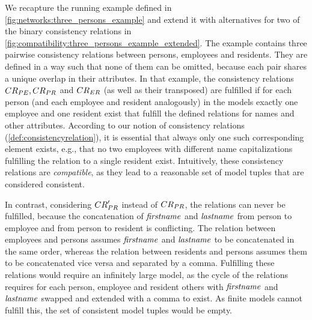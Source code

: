 We recapture the running example defined in \autoref{fig:networks:three_persons_example} and extend it with alternatives for two of the binary consistency relations in \autoref{fig:compatibility:three_persons_example_extended}.
The example contains three pairwise consistency relations between persons, employees and residents.
They are defined in a way such that none of them can be omitted, because each pair shares a unique overlap in their attributes.
In that example, the consistency relations $\consistencyrelation{CR}{PE}, \consistencyrelation{CR}{PR}$ and $\consistencyrelation{CR}{ER}$ (as well as their transposed) are fulfilled if for each person (and each employee and resident analogously) in the models exactly one employee and one resident exist that fulfill the defined relations for names and other attributes.
According to our notion of consistency relations (\autoref{def:consistencyrelation}), it is essential that always only one such corresponding element exists, e.g., that no two employees with different name capitalizations fulfilling the relation to a single resident exist.
Intuitively, these consistency relations are \emph{compatible}, as they lead to a reasonable set of model tuples that are considered consistent.

In contrast, considering $\consistencyrelation{CR}{PR}'$ instead of $\consistencyrelation{CR}{PR}$, the relations can never be fulfilled, because the concatenation of $\mathit{firstname}$ and $\mathit{lastname}$ from person to employee and from person to resident is conflicting.
The relation between employees and persons assumes $\mathit{firstname}$ and $\mathit{lastname}$ to be concatenated in the same order, whereas the relation between residents and persons assumes them to be concatenated vice versa and separated by a comma.
Fulfilling these relations would require an infinitely large model, as the cycle of the relations requires for each person, employee and resident others with $\mathit{firstname}$ and $\mathit{lastname}$ swapped and extended with a comma to exist.
As finite models cannot fulfill this, the set of consistent model tuples would be empty.


